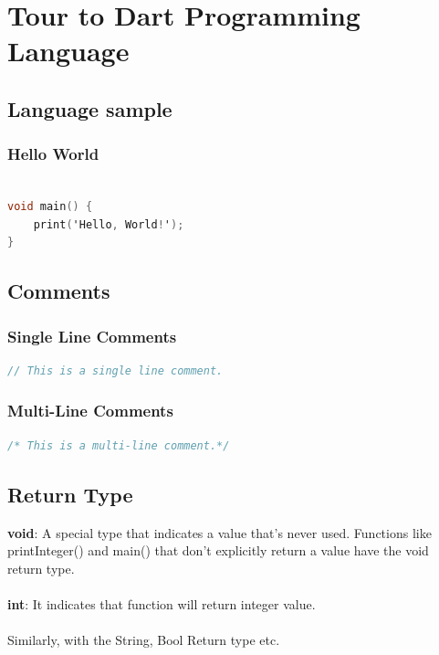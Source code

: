 \chapter{Tour to Dart Programming Language}

\section{Language sample}
\subsection{Hello World}


\begin{lstlisting}[language=C]
	
void main() {
	print('Hello, World!');
}
\end{lstlisting}
%

\section{Comments}
\subsection{Single Line Comments}
\begin{lstlisting}[language=C]
// This is a single line comment.
\end{lstlisting}
\subsection{Multi-Line Comments}
\begin{lstlisting}[language=C]
/* This is a multi-line comment.*/
\end{lstlisting}
\section{Return Type}
\textbf{void}: A special type that indicates a value that's never used. Functions like printInteger() and main() that don't explicitly return a value have the void return type.\\\\
\textbf{int}: It indicates that function will return integer value.\\\\
Similarly, with the String, Bool Return type etc.

